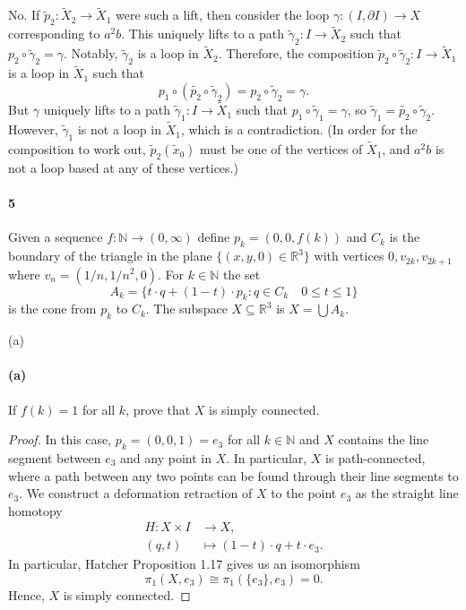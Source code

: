 \documentclass[12pt]{article}
\newlength{\myparskip}
\newenvironment{fullbox}{\begin{lrbox}{\savefullbox}\begin{minipage}{\dimexpr\textwidth-2\fboxsep\relax}\setlength{\parskip}{\myparskip}}{\end{minipage}\end{lrbox}\framebox[\textwidth]{\usebox{\savefullbox}}}
\newenvironment{pbox}[1][]{\begin{fullbox}\ifx#1\empty\else\paragraph{#1}\phantom{}\fi}{\end{fullbox}}
\theoremstyle{definition}
\newcommand{\N}{\mathbb{N}}
\newcommand{\R}{\mathbb{R}}
\newcommand{\<}{\langle}
\renewcommand{\>}{\rangle}
\newcommand{\isom}{\cong}
\newcommand{\seq}{\subseteq}
\newcommand{\bd}{\partial}
\newcommand{\To}{\longrightarrow}
\newcommand{\Mapsto}{\longmapsto}
\begin{document}
No. If $\tilde{p}_2 : \tilde{X}_2 \to \tilde{X}_1$ were such a lift, then consider the loop $\gamma : (I, \bd I) \to X$ corresponding to $a^2b$.
This uniquely lifts to a path $\tilde{\gamma}_2 : I \to \tilde{X}_2$ such that $p_2 \circ \tilde{\gamma}_2 = \gamma$.
Notably, $\tilde{\gamma}_2$ is a loop in $\tilde{X}_2$.
Therefore, the composition $\tilde{p}_2 \circ \tilde{\gamma}_2 : I \to \tilde{X}_1$ is a loop in $\tilde{X}_1$ such that
\[
    p_1 \circ (\tilde{p_2} \circ \tilde{\gamma}_2) = p_2 \circ \tilde{\gamma}_2 = \gamma.
\]
But $\gamma$ uniquely lifts to a path $\tilde{\gamma}_1 : I \to \tilde{X}_1$ such that $p_1 \circ \tilde{\gamma}_1 = \gamma$, so $\tilde{\gamma}_1 = \tilde{p_2} \circ \tilde{\gamma}_2$.
However, $\tilde{\gamma}_1$ is not a loop in $\tilde{X}_1$, which is a contradiction.
(In order for the composition to work out, $\tilde{p}_2(\tilde{x}_0)$ must be one of the vertices of $\tilde{X}_1$, and $a^2b$ is not a loop based at any of these vertices.)




\newpage
\begin{pbox}[5]
    Given a sequence $f : \N \to (0, \infty)$ define $p_k = (0, 0, f(k))$ and $C_k$ is the boundary of the triangle in the plane $\{(x, y, 0) \in \R^3\}$ with vertices $0, v_{2k}, v_{2k+1}$ where $v_n = (1/n, 1/n^2, 0)$.
    For $k \in \N$ the set
    \[
        A_k = \{t \cdot q + (1 - t) \cdot p_k : q \in C_k \quad 0 \leq t \leq 1\}
    \]
    is the cone from $p_k$ to $C_k$.
    The subspace $X \seq \R^3$ is $X = \bigcup A_k$.
\end{pbox}

\begin{pbox}[(a)]
    If $f(k) = 1$ for all $k$, prove that $X$ is simply connected.
\end{pbox}

\begin{proof}
    In this case, $p_k = (0, 0, 1) = e_3$ for all $k \in \N$ and $X$ contains the line segment between $e_3$ and any point in $X$.
    In particular, $X$ is path-connected, where a path between any two points can be found through their line segments to $e_3$.
    We construct a deformation retraction of $X$ to the point $e_3$ as the straight line homotopy
    \begin{align*}
        H : X \times I &\To X, \\
            (q, t) &\Mapsto (1 - t) \cdot q + t \cdot e_3.
    \end{align*}
    In particular, Hatcher Proposition 1.17 gives us an isomorphism
    \[
        \pi_1(X, e_3) \isom \pi_1(\{e_3\}, e_3) = 0.
    \]
    Hence, $X$ is simply connected.
\end{proof}
\end{document}
